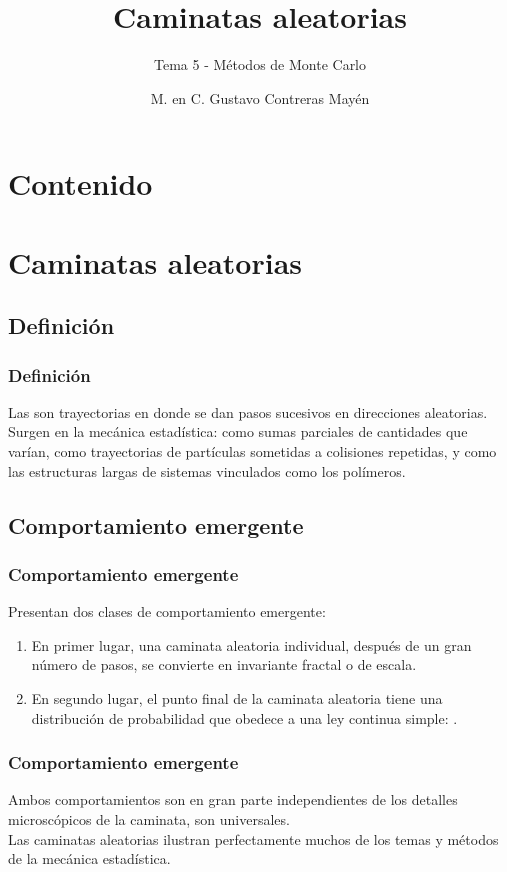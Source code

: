 \documentclass[12pt]{beamer}
\title{Caminatas aleatorias}
\subtitle{Tema 5 - Métodos de Monte Carlo}
\author{M. en C. Gustavo Contreras Mayén}
\begin{document}
\maketitle
\fontsize{14}{14}\selectfont
{}
\newcommand{\localtextbulletone}{\textcolor{gray}{\raisebox{.45ex}{\rule{.6ex}{.6ex}}}}

\section*{Contenido}

\section{Caminatas aleatorias}
\subsection{Definición}

\begin{frame}
\frametitle{Definición}
Las  son trayectorias en donde se dan pasos sucesivos en direcciones aleatorias.
\\
\bigskip
\pause
Surgen en la mecánica estadística: como sumas parciales de cantidades que varían, como trayectorias de partículas sometidas a colisiones repetidas, y como las estructuras largas de sistemas vinculados como los polímeros.
\end{frame}

\subsection{Comportamiento emergente}

\begin{frame}
\frametitle{Comportamiento emergente}
Presentan dos clases de comportamiento emergente:
\begin{enumerate}[<+->]
\item En primer lugar, una caminata aleatoria individual, después de un gran número de pasos, se convierte en invariante fractal o de escala.
\item En segundo lugar, el punto final de la caminata aleatoria tiene una distribución de probabilidad que obedece a una ley continua simple: .
\end{enumerate}
\end{frame}
\begin{frame}
\frametitle{Comportamiento emergente}
Ambos comportamientos son en gran parte independientes de los detalles microscópicos de la caminata, son universales.
\\
\bigskip
\pause
Las caminatas aleatorias ilustran perfectamente muchos de los temas y métodos de la mecánica estadística.
\end{frame}
\end{document}
